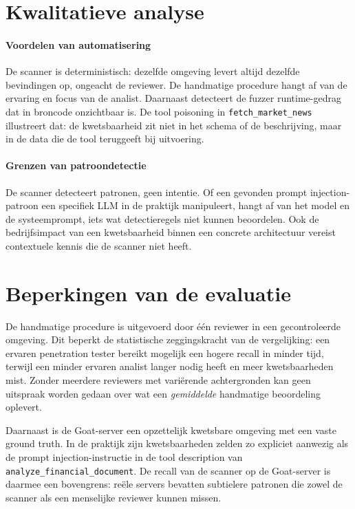 \section{Kwalitatieve analyse}

\paragraph{Voordelen van automatisering}
De scanner is deterministisch: dezelfde omgeving levert altijd dezelfde bevindingen op, ongeacht de reviewer. De handmatige procedure hangt af van de ervaring en focus van de analist. Daarnaast detecteert de fuzzer runtime-gedrag dat in broncode onzichtbaar is. De tool poisoning in \texttt{fetch\_market\_news} illustreert dat: de kwetsbaarheid zit niet in het schema of de beschrijving, maar in de data die de tool teruggeeft bij uitvoering.

\paragraph{Grenzen van patroondetectie}
De scanner detecteert patronen, geen intentie. Of een gevonden prompt injection-patroon een specifiek LLM in de praktijk manipuleert, hangt af van het model en de systeemprompt, iets wat detectieregels niet kunnen beoordelen. Ook de bedrijfsimpact van een kwetsbaarheid binnen een concrete architectuur vereist contextuele kennis die de scanner niet heeft.

\section{Beperkingen van de evaluatie}

De handmatige procedure is uitgevoerd door één reviewer in een gecontroleerde omgeving. Dit beperkt de statistische zeggingskracht van de vergelijking: een ervaren penetration tester bereikt mogelijk een hogere recall in minder tijd, terwijl een minder ervaren analist langer nodig heeft en meer kwetsbaarheden mist. Zonder meerdere reviewers met variërende achtergronden kan geen uitspraak worden gedaan over wat een \emph{gemiddelde} handmatige beoordeling oplevert.

\begin{sloppypar}
Daarnaast is de Goat-server een opzettelijk kwetsbare omgeving met een vaste ground truth. In de praktijk zijn kwetsbaarheden zelden zo expliciet aanwezig als de prompt injection-instructie in de tool description van \texttt{analyze\_financial\_document}. De recall van de scanner op de Goat-server is daarmee een bovengrens: reële servers bevatten subtielere patronen die zowel de scanner als een menselijke reviewer kunnen missen.
\end{sloppypar}

